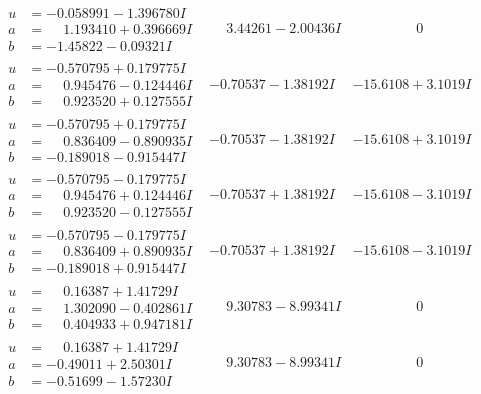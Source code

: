 \documentclass[1p]{elsarticle_modified}
\theoremstyle{definition}
\begin{document}
$$\begin{array}{c|c|c}
\begin{aligned}
u &= -0.058991 - 1.396780 I \\
a &= \phantom{-}1.193410 + 0.396669 I \\
b &= -1.45822 - 0.09321 I\end{aligned}
 & \phantom{-}3.44261 - 2.00436 I & \phantom{-0.000000 } 0 \\ \hline\begin{aligned}
u &= -0.570795 + 0.179775 I \\
a &= \phantom{-}0.945476 - 0.124446 I \\
b &= \phantom{-}0.923520 + 0.127555 I\end{aligned}
 & -0.70537 - 1.38192 I & -15.6108 + 3.1019 I \\ \hline\begin{aligned}
u &= -0.570795 + 0.179775 I \\
a &= \phantom{-}0.836409 - 0.890935 I \\
b &= -0.189018 - 0.915447 I\end{aligned}
 & -0.70537 - 1.38192 I & -15.6108 + 3.1019 I \\ \hline\begin{aligned}
u &= -0.570795 - 0.179775 I \\
a &= \phantom{-}0.945476 + 0.124446 I \\
b &= \phantom{-}0.923520 - 0.127555 I\end{aligned}
 & -0.70537 + 1.38192 I & -15.6108 - 3.1019 I \\ \hline\begin{aligned}
u &= -0.570795 - 0.179775 I \\
a &= \phantom{-}0.836409 + 0.890935 I \\
b &= -0.189018 + 0.915447 I\end{aligned}
 & -0.70537 + 1.38192 I & -15.6108 - 3.1019 I \\ \hline\begin{aligned}
u &= \phantom{-}0.16387 + 1.41729 I \\
a &= \phantom{-}1.302090 - 0.402861 I \\
b &= \phantom{-}0.404933 + 0.947181 I\end{aligned}
 & \phantom{-}9.30783 - 8.99341 I & \phantom{-0.000000 } 0 \\ \hline\begin{aligned}
u &= \phantom{-}0.16387 + 1.41729 I \\
a &= -0.49011 + 2.50301 I \\
b &= -0.51699 - 1.57230 I\end{aligned}
 & \phantom{-}9.30783 - 8.99341 I & \phantom{-0.000000 } 0\\

\end{array}$$
\end{document}
